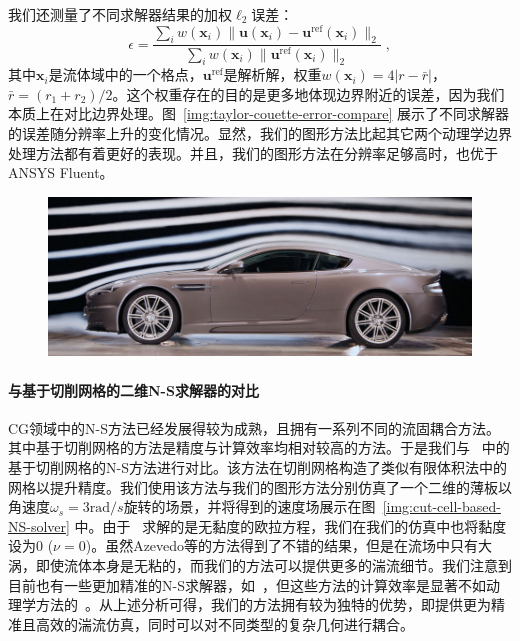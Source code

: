 我们还测量了不同求解器结果的加权$\ell_2$误差：
\begin{equation}\label{eq:error_metric}
\epsilon = \frac{\sum_i w(\bm{x}_i)\|\bm{u}(\bm{x}_i)-\bm{u}^{\text{ref}}(\bm{x}_i)\|_2}{\sum_i w(\bm{x}_i)\|\bm{u}^{\text{ref}}(\bm{x}_i)\|_2}\;,
\end{equation}
其中$\bm{x}_i$是流体域中的一个格点，$\bm{u}^{\text{ref}}$是解析解，权重$w(\bm{x}_i) \!=\! 4|r-\bar{r}|$，$\bar{r}\!=\!(r_1+r_2)/2$。这个权重存在的目的是更多地体现边界附近的误差，因为我们本质上在对比边界处理。图~\ref{img:taylor-couette-error-compare} 展示了不同求解器的误差随分辨率上升的变化情况。显然，我们的图形方法比起其它两个动理学边界处理方法都有着更好的表现。并且，我们的图形方法在分辨率足够高时，也优于ANSYS Fluent。

\begin{figure}[htbp]
  \centering
    \includegraphics[width=0.99\columnwidth]{figures/car_wind_tunnel.png}
  \label{img:car_wind_tunnel}
\end{figure}

\paragraph{与基于切削网格的二维N-S求解器的对比}
CG领域中的N-S方法已经发展得较为成熟，且拥有一系列不同的流固耦合方法。其中基于切削网格的方法是精度与计算效率均相对较高的方法。于是我们与~\citep{Azevedo-2016} 中的基于切削网格的N-S方法进行对比。该方法在切削网格构造了类似有限体积法中的网格以提升精度。我们使用该方法与我们的图形方法分别仿真了一个二维的薄板以角速度$\omega_s = 3 \text{rad}/s$旋转的场景，并将得到的速度场展示在图~\ref{img:cut-cell-based-NS-solver} 中。由于~\citet{Azevedo-2016} 求解的是无黏度的欧拉方程，我们在我们的仿真中也将黏度设为0 ($\nu\!=\!0$)。虽然Azevedo等的方法得到了不错的结果，但是在流场中只有大涡，即使流体本身是无粘的，而我们的方法可以提供更多的湍流细节。我们注意到目前也有一些更加精准的N-S求解器，如~\citep{zehnder2018advection,qu2019efficient}，但这些方法的计算效率是显著不如动理学方法的~\citep{Li-2020}。从上述分析可得，我们的方法拥有较为独特的优势，即提供更为精准且高效的湍流仿真，同时可以对不同类型的复杂几何进行耦合。

